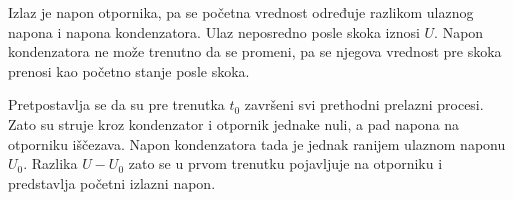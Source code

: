 Izlaz je napon otpornika, pa se početna vrednost određuje razlikom ulaznog napona i napona kondenzatora. Ulaz neposredno posle skoka iznosi $U$. Napon kondenzatora ne može trenutno da se promeni, pa se njegova vrednost pre skoka prenosi kao početno stanje posle skoka.

Pretpostavlja se da su pre trenutka $t_0$ završeni svi prethodni prelazni procesi. Zato su struje kroz kondenzator i otpornik jednake nuli, a pad napona na otporniku iščezava. Napon kondenzatora tada je jednak ranijem ulaznom naponu $U_0$. Razlika $U-U_0$ zato se u prvom trenutku pojavljuje na otporniku i predstavlja početni izlazni napon.
